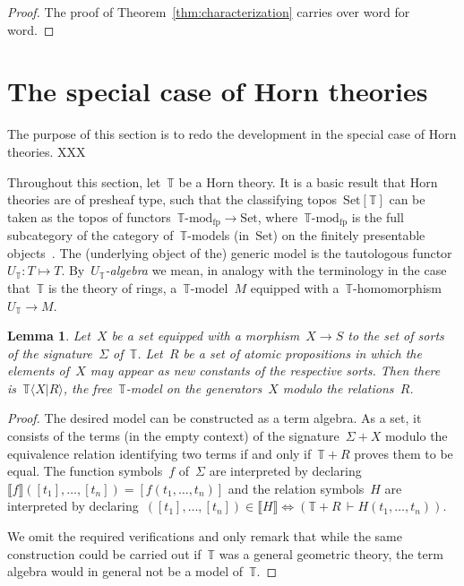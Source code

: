 \documentclass[oneside,reqno]{amsart}
\theoremstyle{definition}
\theoremstyle{plain}
\newtheorem{lemma}[defn]{Lemma}
\theoremstyle{remark}
\newcommand{\TT}{\mathbb{T}}
\newcommand{\Set}{\mathrm{Set}}
\renewcommand{\_}{\mathpunct{.}\,}
\newcommand{\?}{\,{:}\,}
\newcommand{\brak}[1]{\llbracket #1 \rrbracket}
\newcommand{\Mod}[1]{{#1}\mathrm{\text{-}mod}}
\begin{document}
\begin{proof}The proof of Theorem~\ref{thm:characterization} carries over word
for word.
\end{proof}


\section{The special case of Horn theories}
\label{sect:horn}

The purpose of this section is to redo the development in the special case of
Horn theories. XXX

Throughout this section, let~$\TT$ be a Horn theory. It is a basic result that
Horn theories are of presheaf type, such that the classifying topos~$\Set[\TT]$
can be taken as the topos of functors~$\Mod{\TT}_\mathrm{fp} \to \Set$,
where~$\Mod{\TT}_\mathrm{fp}$ is the full subcategory of the category
of~$\TT$-models (in~$\Set$) on the finitely presentable objects~\cite[Theorem~2.1.21]{caramello:tst}. The
(underlying object of the) generic model is the tautologous functor~$U_\TT : T
\mapsto T$. By~\emph{$U_\TT$-algebra} we mean, in analogy with the terminology in
the case that~$\TT$ is the theory of rings, a~$\TT$-model~$M$ equipped with
a~$\TT$-homomorphism~$U_\TT \to M$.


\begin{lemma}\label{lemma:free-models}
Let~$X$ be a set equipped with a morphism~$X \to S$ to the set of sorts
of the signature~$\Sigma$ of~$\TT$. Let~$R$ be a set of atomic propositions in which the
elements of~$X$ may appear as new constants of the respective sorts. Then there
is~$\TT\langle X | R \rangle$, the free~$\TT$-model on the generators~$X$ modulo
the relations~$R$.\end{lemma}

\begin{proof}The desired model can be constructed as a term algebra. As a set,
it consists of the terms (in the empty context) of the signature~$\Sigma + X$
modulo the equivalence relation identifying two terms if and only if~$\TT + R$
proves them to be equal. The function symbols~$f$ of~$\Sigma$ are interpreted
by declaring~$\brak{f}([t_1],\ldots,[t_n]) = [f(t_1,\ldots,t_n)]$ and the
relation symbols~$H$ are interpreted by declaring~$([t_1],\ldots,[t_n]) \in
\brak{H} \Leftrightarrow (\TT + R \,\vdash H(t_1,\ldots,t_n))$.

We omit the required verifications and only remark that while the same
construction could be carried out if~$\TT$ was a general geometric theory, the
term algebra would in general not be a model of~$\TT$.
\end{proof}
\end{document}
